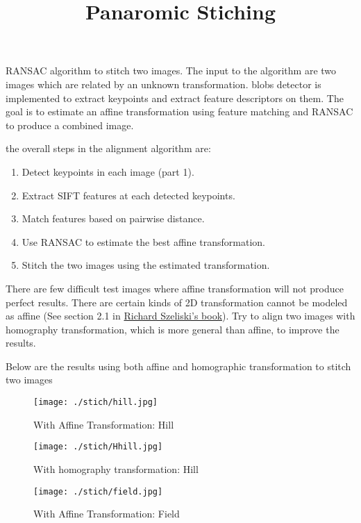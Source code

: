 \documentclass[10pt,letterpaper]{article}
\title{
  \textbf{Panaromic Stiching} \\
}
\date{}
\begin{document}
\maketitle

\renewcommand\thesubsection{\thesection.\alph{subsection}}


RANSAC algorithm to stitch two images. The input to the algorithm are two images which are related by an unknown transformation.  blobs detector is  implemented to extract keypoints and extract feature descriptors on them.  The goal is to estimate an affine transformation using feature matching and RANSAC to produce a combined image. 

the overall steps in the alignment algorithm are:
\begin{enumerate}
\item Detect keypoints in each image (part 1).
\item Extract SIFT features at each detected keypoints.
\item Match features based on pairwise distance.
\item Use RANSAC to estimate the best affine transformation.
\item Stitch the two images using the estimated transformation.
\end{enumerate}


There are few difficult test images where affine transformation will not produce perfect results. There are certain kinds of 2D transformation cannot be modeled as affine (See section 2.1 in \href{http://szeliski.org/Book/drafts/SzeliskiBook_20100903_draft.pdf}{Richard Szeliski's book}). Try to align two images with homography transformation, which is more general than affine, to improve the results.

Below are the results using both affine and homographic transformation to stitch two images

\begin{figure}[h]
\centering
\texttt{[image: ./stich/hill.jpg]} 
\caption{\label{fig:dummy} With Affine Transformation: Hill}
\end{figure}

\begin{figure}[h]
\centering
\texttt{[image: ./stich/Hhill.jpg]} 
\caption{\label{fig:dummy} With homography transformation: Hill}
\end{figure}

\begin{figure}[h]
\centering
\texttt{[image: ./stich/field.jpg]} 
\caption{\label{fig:dummy} With Affine Transformation: Field}
\end{figure}
\end{document}
